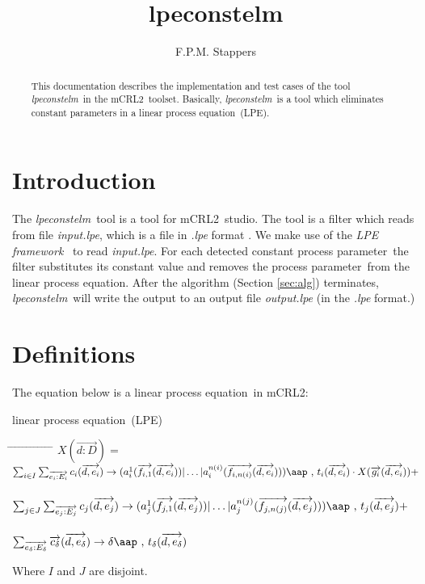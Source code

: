\index{}\documentclass[a4paper,10pt]{article}
\title{lpeconstelm}
\author{F.P.M. Stappers}
\theoremstyle{plain}
\theoremstyle{definition}
\newcommand{\lpe}{linear process equation}
\newcommand{\tool}{\textit{lpeconstelm}}
\newcommand{\ovr}{\overrightarrow}
\newcommand{\mcrl}{mCRL2}
\newcommand{\framework}{\textit{LPE framework} \cite{LPEframework}}
\newcommand{\pp}{process parameter}
\newcommand{\ti}{\textit}
\newcommand{\tab}{\hspace*{5.mm} \= \hspace*{5.mm} \= \hspace*{5.mm} \= \hspace*{5.mm} \= \hspace*{5.mm} \= \hspace*{5.mm}  \= \hspace*{5.mm}  \= \hspace*{5.mm}  \= \hspace*{5.mm} \= \hspace*{5.mm} \= \hspace*{5.mm}  \= \hspace*{5.mm}  \= \hspace*{5.mm}\kill}
\newcommand{\at}[1]{\mbox{\aap ,} #1}
\begin{document}
\maketitle

\begin{abstract}
This documentation describes the implementation and test cases of the tool \tool\ in  the \mcrl\ toolset.
Basically, \tool\ is a tool which eliminates constant parameters in a \lpe\ (LPE).
\end{abstract}

\tableofcontents

\section{Introduction}
The \tool\ tool is a tool for \mcrl\ studio. The tool is a
filter which reads from file \ti{input.lpe}, which is
a file in \ti{.lpe} format \cite{LPEformat}. We make use of the
\framework\ to read \ti{input.lpe}. For
each detected constant \pp\ the filter substitutes its constant value and removes the \pp\ from the
\lpe . After the algorithm (Section \ref{sec:alg}) terminates, \tool\
will write the output to an output file \ti{output.lpe} (in the \ti{.lpe} format.)

\section{Definitions} \label{sec:def}

The equation below is a \lpe\ in \mcrl : 
\begin{defn}\lpe\ (LPE) \newline
\begin{tabbing}
\tab
$X (\ovr{d: D}) = $ \> \> \> $ \sum_{i \in I} \sum_{\ovr{e_i: E_i}} c_i ( \ovr{d, e_i }) \rightarrow 
(a_i^1 (\ovr{f_{i,1}}(\ovr{d,e_i})) \vert \ldots \vert a_i^{n(i)}(\ovr{f_{i,n(i)}}(\ovr{d,e_i}))) \at \text{ } t_i(\ovr{d,e_i})  \cdot X(\ovr{g_i}(\ovr{d,e_i})) +$ \\ \\
\> \> \> $ \sum_{j \in J} \sum_{\ovr{e_j: E_j}} c_j ( \ovr{d, e_j} ) \rightarrow 
(a_j^1 (\ovr{f_{j,1}}(\ovr{d,e_j})) \vert \ldots \vert a_j^{n(j)}(\ovr{f_{j,n(j)}}(\ovr{d,e_j}))) \at \text{ } t_j(\ovr{d,e_j}) + $ \\ \\
\> \> \> $\sum_{\ovr{e_\delta:E_\delta}} \ovr{c_\delta} ( \ovr{d, e_\delta}) \rightarrow 
\delta \at \text{ } t_\delta(\ovr{d,e_\delta})$ 
\end{tabbing}

Where $I$ and $J$ are disjoint.\\
\end{defn}
\end{document}
